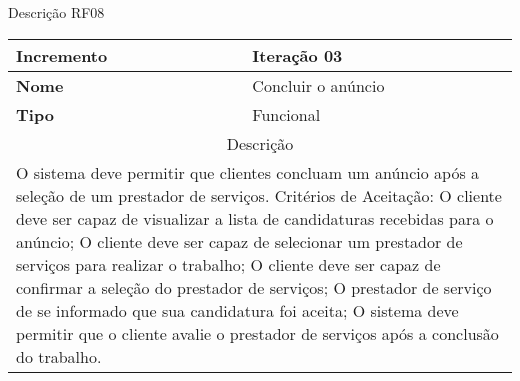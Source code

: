 \begin{quadro}[htb]
	\centering
	\caption{\label{Formatação do texto.}Descrição RF08}	
	\begin{tabular}{|l|p{11cm}|}
		\hline
		\textbf{Incremento}    & Iteração 03\\ \hline
		\textbf{Nome}    & Concluir o anúncio\\ \hline
		\textbf{Tipo}    & Funcional\\ \hline
		\multicolumn{2}{|c|}{Descrição}\\ \hline
		\multicolumn{2}{|p{12cm}|}{
			O sistema deve permitir que clientes concluam um anúncio após a seleção de um prestador de serviços. \newline
			\newline Critérios de Aceitação: \newline
			O cliente deve ser capaz de visualizar a lista de candidaturas recebidas para o anúncio; \newline
            O cliente deve ser capaz de selecionar um prestador de serviços para realizar o trabalho; \newline
			O cliente deve ser capaz de confirmar a seleção do prestador de serviços; \newline
			O prestador de serviço de se informado que sua candidatura foi aceita; \newline
			O sistema deve permitir que o cliente avalie o prestador de serviços após a conclusão do trabalho.
			} \\ \hline
	\end{tabular}
\end{quadro}

